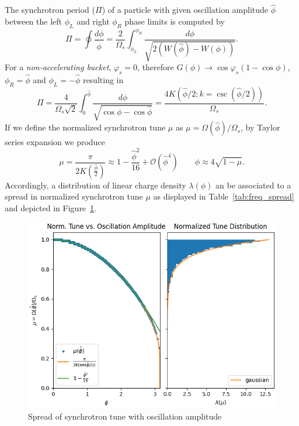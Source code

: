 The synchrotron period  ($\Pi$) of a particle with given oscillation amplitude $\hat{\phi}$ between the left $\phi_L$ and right $\phi_R$ phase limits is computed by
$$\Pi = \oint \frac{d\phi}{\dot{\phi}} = \frac{2}{\Omega_s}\int_{\phi_L}^{\phi_R} \frac{d\phi}{\sqrt{2(W(\hat{\phi})-W(\phi))}}.$$ 
For a \textit{non-accelerating bucket}, $\varphi_s = 0$, therefore $G(\phi) \to \cos\varphi_s(1-\cos\phi)$, $\phi_R = \hat{\phi}$ and $\phi_L = -\hat{\phi}$ resulting in
$$\Pi = \frac{4}{\Omega_s\sqrt{2}}\int_0^{\hat{\phi}}\frac{d\phi}{\sqrt{\cos\phi-\cos\hat{\phi}}} = \frac{4K(\hat{\phi}/2; k=\csc(\hat{\phi}/2))}{\Omega_s}.$$
If we define the normalized synchrotron tune $\mu$ as $\mu = \Omega(\hat{\phi})/\Omega_s$, by Taylor series expansion we produce
\begin{equation}
    \mu =\frac{\pi}{2K(\frac{\hat{\phi}}{2})} \approx 1-\frac{\hat{\phi}^2}{16} +\mathcal{O}(\hat{\phi}^4) \qquad \phi \approx 4\sqrt{1-\mu}
    \label{eq:tune_spread}.
\end{equation}
Accordingly, a distribution of linear charge density $\lambda(\phi)$ an be associated to a spread in normalized synchrotron tune $\mu$ as displayed in Table~\ref{tab:freq_spread} and depicted in Figure~\ref{fig:tune_spread}.



\begin{figure}
    \centering
    \includegraphics{figs/single_particle_motion/normalized_tune.png}
    \caption{Spread of synchrotron tune with oscillation amplitude}
    \label{fig:tune_spread}
\end{figure}

